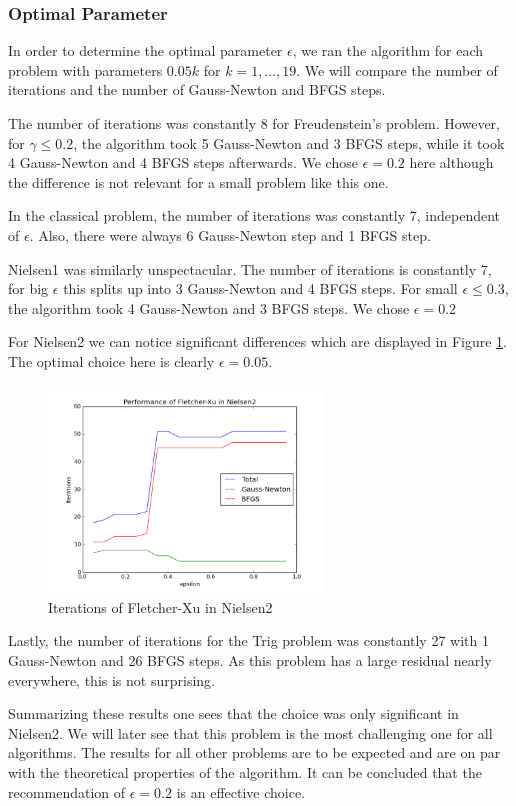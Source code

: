 \documentclass{article}
\theoremstyle{plain}%
\theoremstyle{definition}
\begin{document}
\subsubsection{Optimal Parameter}
In order to determine the optimal parameter $\epsilon$, we ran the algorithm for each
problem with parameters $0.05k$ for $k=1,\ldots,19$. We will compare the number
of iterations and the number of Gauss-Newton and BFGS steps. \par
The number of iterations was constantly 8 for Freudenstein's problem. However,
for $\gamma\leq 0.2$, the algorithm took 5 Gauss-Newton and 3 BFGS steps, while it took
4 Gauss-Newton and 4 BFGS steps afterwards. We chose $\epsilon=0.2$ here although the difference
is not relevant for a small problem like this one.\par
In the classical  problem, the number of iterations was constantly 7, independent of $\epsilon$.
Also, there were always 6 Gauss-Newton step and 1 BFGS step. \par
Nielsen1 was similarly unspectacular. The number of iterations is constantly 7, for big $\epsilon$
this splits up into 3 Gauss-Newton and 4 BFGS steps. For small $\epsilon \leq 0.3$, the algorithm
took 4 Gauss-Newton and 3 BFGS steps. We chose $\epsilon=0.2$ \par
For Nielsen2 we can notice significant differences which are displayed in Figure \ref{Nielsen2}.
The optimal choice here is clearly $\epsilon=0.05$.
\begin{figure}
    \centering
        \includegraphics[width=0.65\textwidth]{nielsen2.png}
        \caption{Iterations of Fletcher-Xu in Nielsen2}
        \label{Nielsen2}
\end{figure}
Lastly, the number of iterations for the Trig problem was constantly 27 with 1 Gauss-Newton
and 26 BFGS steps. As this problem has a large residual nearly everywhere, this is not surprising. \par
Summarizing these results one sees that the choice was only significant in Nielsen2. We will later
see  that this problem is the most challenging one for all algorithms. The results for
all other problems are to be expected and are on par with the theoretical properties of
the algorithm. It can be concluded that the recommendation of $\epsilon=0.2$ is an effective choice.
\end{document}
